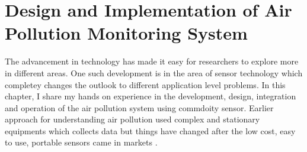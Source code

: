 \documentclass[11pt]{article}
\begin{document}
\section*{Design and Implementation of Air Pollution Monitoring System}

The advancement in technology has made it easy for researchers to explore more in different areas. One such development is in the area of sensor technology which completey changes the outlook to different application level problems. In this chapter, I share my hands on experience in the development, design, integration and operation of the air pollution system using commdoity sensor. Earlier approach for understanding air pollution used complex and stationary equipments which collects data but things have changed after the low cost, easy to use, portable sensors came in markets \cite{Snyder2013}. 



\end{document}
